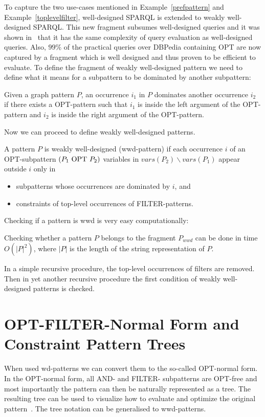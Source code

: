 To capture the two use-cases mentioned in
Example~\ref{prefpattern} and Example~\ref{toplevelfilter}, well-designed SPARQL is extended to weakly well-designed SPARQL.
This new fragment subsumes well-designed queries and it was shown in~\cite{kaminski_bwd} 
that it has the same complexity 
of query evaluation as well-designed queries. 
Also, $99\%$ of the practical queries over DBPedia containing OPT are now captured by a 
fragment which is well designed and thus proven to be efficient to evaluate.
To define the fragment of weakly well-designed pattern we need to define what it
means for a subpattern to be dominated by another subpattern:
\begin{definition}
	Given a graph pattern $P$, an occurrence $i_1$ in $P$ dominates another
	occurrence $i_2$ if there exists a OPT-pattern such
	that $i_1$ is inside the left argument of the OPT-pattern and $i_2$ is
	inside the right argument of the OPT-pattern.
\end{definition}

Now we can proceed to define weakly well-designed patterns.
\begin{definition}
	A pattern $P$ is weakly well-designed (wwd-pattern) if each occurrence $i$
	of an OPT-subpattern $(P_1\mbox{ OPT } P_2)$ variables in $vars(P_2) \backslash
	vars(P_1)$ appear outside $i$ only in
	\begin{itemize}
		\item subpatterns whose occurrences are dominated by $i$, and
		\item constraints of top-level occurrences of FILTER-patterns.
	\end{itemize}
\end{definition}
Checking if a pattern is wwd is very easy computationally:
\begin{proposition}
	Checking whether a pattern $P$ belongs to the fragment $P_{wwd}$ can be done
	in time $O(|P|^2)$, where $|P|$ is the length of the string representation
	of $P$.
\end{proposition}
\begin{proofidea}
	In a simple recursive procedure, the top-level occurrences of filters are
	removed.  Then in yet another recursive procedure  the first condition of
	weakly well-designed patterns is checked. 
\end{proofidea}

\section{OPT-FILTER-Normal Form and Constraint Pattern Trees}
When used wd-patterns we can convert them to the so-called
OPT-normal form. In the OPT-normal form, all AND- and FILTER- subpatterns are
OPT-free and most importantly the pattern can then be naturally represented as a
tree. The resulting tree can be used to visualize how to evaluate and optimize
the original pattern~\cite{letelier2013static, pichler2014containment}. The tree
notation can be generalised to wwd-patterns.


